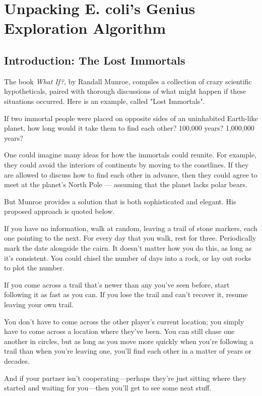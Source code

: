 \chapter[Unpacking E. coli’s Genius Exploration Algorithm]{Unpacking E. coli’s Genius Exploration Algorithm}
\label{chapter:chemotaxis}
\renewcommand{\chaptertitle}{Unpacking E. coli’s Genius Exploration Algorithm}


\FloatBarrier

\section{Introduction: The Lost Immortals}
\label{sec:introduction}

The book \textit{What If?}\citep{Munroe_2014}, by Randall Munroe, compiles a collection of crazy scientific hypotheticals, paired with thorough discussions of what might happen if these situations occurred. Here is an example, called "Lost Immortals".

\begin{displayquote}
If two immortal people were placed on opposite sides of an uninhabited Earth-like planet, how long would it take them to find each other? 100,000 years? 1,000,000 years?
\end{displayquote}

One could imagine many ideas for how the immortals could reunite. For example, they could avoid the interiors of continents by moving to the coastlines. If they are allowed to discuss how to find each other in advance, then they could agree to meet at the planet's North Pole --- assuming that the planet lacks polar bears.

But Munroe provides a solution that is both sophisticated and elegant. His proposed approach is quoted below.

\begin{displayquote}
If you have no information, walk at random, leaving a trail of stone markers, each one pointing to the next. For every day that you walk, rest for three. Periodically mark the date alongside the cairn. It doesn’t matter how you do this, as long as it’s consistent. You could chisel the number of days into a rock, or lay out rocks to plot the number.

If you come across a trail that’s newer than any you’ve seen before, start following it as fast as you can. If you lose the trail and can’t recover it, resume leaving your own trail.

You don’t have to come across the other player’s current location; you simply have to come across a location where they’ve been. You can still chase one another in circles, but as long as you move more quickly when you’re following a trail than when you’re leaving one, you’ll find each other in a matter of years or decades.

And if your partner isn’t cooperating—perhaps they’re just sitting where they started and waiting for you—then you’ll get to see some neat stuff.
\end{displayquote}

